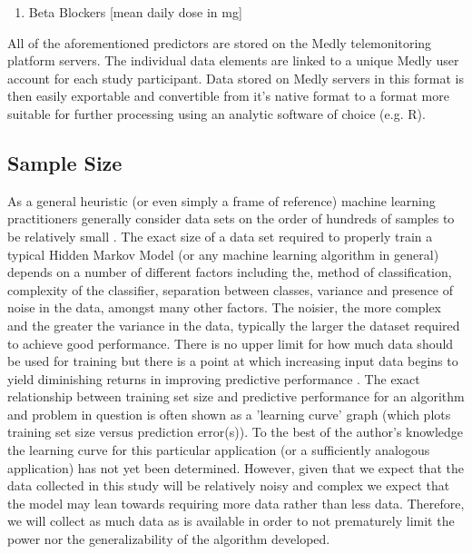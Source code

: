 \documentclass[]{article}
\begin{document}
\begin{enumerate}
\begin{enumerate}
		\item Beta Blockers [mean daily dose in mg]  %
	\end{enumerate} 
\end{enumerate}

All of the aforementioned predictors are stored on the Medly telemonitoring platform servers. The individual data elements are linked to a unique Medly user account for each study participant. Data stored on Medly servers in this format is then easily exportable and convertible from it's native format to a format more suitable for further processing using an analytic software of choice (e.g. R).  

\subsection{Sample Size} %

As a general heuristic (or even simply a frame of reference) machine learning practitioners generally consider data sets on the order of hundreds of samples to be relatively small \cite{Acta2013,Figueroa2012,Brownlee2017}. The exact size of a data set required to properly train a typical Hidden Markov Model (or any machine learning algorithm in general) depends on a number of different factors including the, method of classification, complexity of the classifier, separation between classes, variance and presence of noise in the data, amongst many other factors. The noisier, the more complex and the greater the variance in the data, typically the larger the dataset required to achieve good performance. There is no upper limit for how much data should be used for training but there is a point at which increasing input data begins to yield diminishing returns in improving predictive performance \cite{Brownlee2017}. The exact relationship between training set size and predictive performance for an algorithm and problem in question is often shown as a 'learning curve' graph (which plots training set size versus prediction error(s)). To the best of the author's knowledge the learning curve for this particular application (or a sufficiently analogous application) has not yet been determined. However, given that we expect that the data collected in this study will be relatively noisy and complex we expect that the model may lean towards requiring more data rather than less data. Therefore, we will collect as much data as is available in order to not prematurely limit the power nor the generalizability of the algorithm developed.
\end{document}
